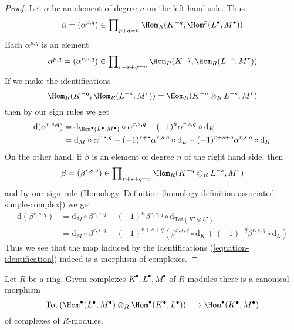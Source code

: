 \begin{proof}
Let $\alpha$ be an element of degree $n$ on the left hand side.
Thus
$$
\alpha = (\alpha^{p, q}) \in
\prod\nolimits_{p + q = n} \Hom_R(K^{-q}, \Hom^p(L^\bullet, M^\bullet))
$$
Each $\alpha^{p, q}$ is an element
$$
\alpha^{p, q} = (\alpha^{r, s, q}) \in
\prod\nolimits_{r + s + q = n} \Hom_R(K^{-q}, \Hom_R(L^{-s}, M^r))
$$
If we make the identifications
\begin{equation}
\label{equation-identification}
\Hom_R(K^{-q}, \Hom_R(L^{-s}, M^r)) = \Hom_R(K^{-q} \otimes_R L^{-s}, M^r)
\end{equation}
then by our sign rules we get
\begin{align*}
\text{d}(\alpha^{r, s, q})
& =
\text{d}_{\Hom^\bullet(L^\bullet, M^\bullet)} \circ \alpha^{r, s, q}
- (-1)^n \alpha^{r, s, q} \circ \text{d}_K \\
& =
\text{d}_M \circ \alpha^{r, s, q}
- (-1)^{r + s} \alpha^{r, s, q} \circ \text{d}_L
- (-1)^{r + s + q} \alpha^{r, s, q} \circ \text{d}_K
\end{align*}
On the other hand, if $\beta$ is an element of degree $n$ of
the right hand side, then
$$
\beta = (\beta^{r, s, q}) \in \prod\nolimits_{r + s + q = n}
\Hom_R(K^{-q} \otimes_R L^{-s}, M^r)
$$
and by our sign rule (Homology, Definition
\ref{homology-definition-associated-simple-complex}) we get
\begin{align*}
\text{d}(\beta^{r, s, q})
& =
\text{d}_M \circ \beta^{r, s, q}
- (-1)^n \beta^{r, s, q} \circ
\text{d}_{\text{Tot}(K^\bullet \otimes L^\bullet)} \\
& =
\text{d}_M \circ \beta^{r, s, q}
- (-1)^{r + s + q} \left(
\beta^{r, s, q} \circ \text{d}_K + (-1)^{-q} \beta^{r, s, q} \circ \text{d}_L
\right)
\end{align*}
Thus we see that the map induced by the identifications
(\ref{equation-identification}) indeed is a morphism of complexes.
\end{proof}

\begin{lemma}
\label{lemma-composition}
Let $R$ be a ring. Given complexes
$K^\bullet, L^\bullet, M^\bullet$
of $R$-modules there is a canonical morphism
$$
\text{Tot}\left(
\Hom^\bullet(L^\bullet, M^\bullet) \otimes_R \Hom^\bullet(K^\bullet, L^\bullet)
\right)
\longrightarrow
\Hom^\bullet(K^\bullet, M^\bullet)
$$
of complexes of $R$-modules.
\end{lemma}

